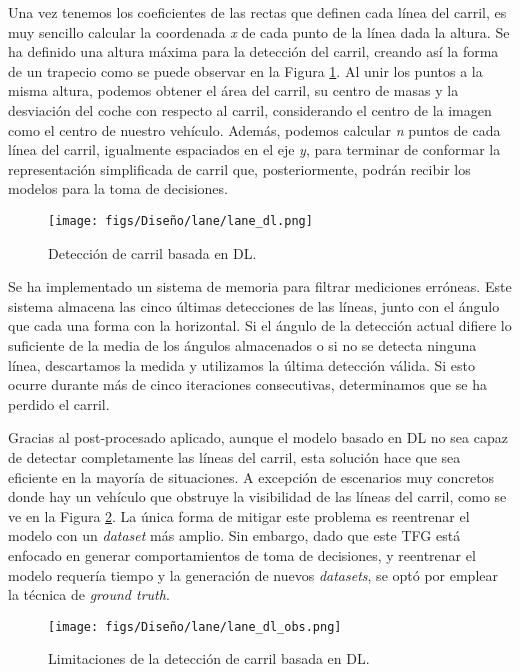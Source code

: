 Una vez tenemos los coeficientes de las rectas que definen cada línea del carril, es muy sencillo calcular la coordenada \textit{x} de cada punto de la línea dada la altura. Se ha definido una altura máxima para la detección del carril, creando así la forma de un trapecio como se puede observar en la Figura \ref{fig:dl_final_carril}. Al unir los puntos a la misma altura, podemos obtener el área del carril, su centro de masas y la desviación del coche con respecto al carril, considerando el centro de la imagen como el centro de nuestro vehículo. Además, podemos calcular \textit{n} puntos de cada línea del carril, igualmente espaciados en el eje \textit{y}, para terminar de conformar la representación simplificada de carril que, posteriormente, podrán recibir los modelos para la toma de decisiones.

\begin{figure}[ht]
\centering
\texttt{[image: figs/Diseño/lane/lane\_dl.png]}
\caption{Detección de carril basada en \ac{DL}.}
\label{fig:dl_final_carril}
\end{figure}

Se ha implementado un sistema de memoria para filtrar mediciones erróneas. Este sistema almacena las cinco últimas detecciones de las líneas, junto con el ángulo que cada una forma con la horizontal. Si el ángulo de la detección actual difiere lo suficiente de la media de los ángulos almacenados o si no se detecta ninguna línea, descartamos la medida y utilizamos la última detección válida. Si esto ocurre durante más de cinco iteraciones consecutivas, determinamos que se ha perdido el carril.

Gracias al post-procesado aplicado, aunque el modelo basado en \ac{DL} no sea capaz de detectar completamente las líneas del carril, esta solución hace que sea eficiente en la mayoría de situaciones. A excepción de escenarios muy concretos donde hay un vehículo que obstruye la visibilidad de las líneas del carril, como se ve en la Figura \ref{fig:dl_final_carril_obs}. La única forma de mitigar este problema es reentrenar el modelo con un \textit{dataset} más amplio. Sin embargo, dado que este \ac{TFG} está enfocado en generar comportamientos de toma de decisiones, y reentrenar el modelo requería tiempo y la generación de nuevos \textit{datasets}, se optó por emplear la técnica de \textit{ground truth}.
\begin{figure}[ht]
\centering
\texttt{[image: figs/Diseño/lane/lane\_dl\_obs.png]}
\caption{Limitaciones de la detección de carril basada en \ac{DL}.}
\label{fig:dl_final_carril_obs}
\end{figure}

